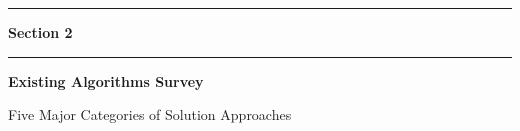 \documentclass[aspectratio=169,10pt]{beamer}
\begin{document}

{
\begin{frame}[plain]

  \begin{center}
    {\color{goldaccent}\rule{0.15\textwidth}{2pt}}
    \hspace{0.5em}
    {\color{white}\large\textbf{Section 2}}
    \hspace{0.5em}
    {\color{goldaccent}\rule{0.15\textwidth}{2pt}}

    \vspace{0.6cm}
    {\color{white}\Huge\textbf{Existing Algorithms Survey}}

    \vspace{0.4cm}
    {\color{iceblue}\normalsize Five Major Categories of Solution Approaches}
  \end{center}
\end{frame}
}
\end{document}
